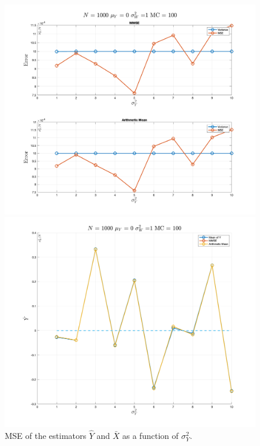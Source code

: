 \begin{figure}[H]
    \centering
    \begin{minipage}{0.45\textwidth}
        \centering
        \includegraphics[width=\textwidth]{./figures/appendix_a/figure_7.png}
    \end{minipage}
    \hfill
    \begin{minipage}{0.45\textwidth}
        \centering
        \includegraphics[width=\textwidth]{./figures/appendix_a/figure_8.png}
    \end{minipage}
    \caption{MSE of the estimators $\hat Y$ and $\bar X$ as a function of $\sigma^2_Y$.}
    \label{fig:mmse_sigma_y_combined}
\end{figure}

